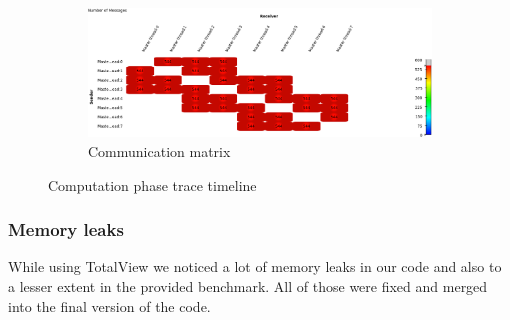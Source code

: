 \documentclass{article}
\begin{document}
\begin{figure}
\begin{subfigure}[b]{\textwidth}
	\end{subfigure}
	\begin{subfigure}[b]{\textwidth}
		\includegraphics[width=\textwidth]{comp-pent-dual-allread-8-Communication_Matrix_View_traces.png}
		\caption{Communication matrix}
		\label{fig:commatrx}
	\end{subfigure}
	\caption{Computation phase trace timeline}\label{fig:8}
\end{figure}

\subsubsection{Memory leaks}
While using TotalView we noticed a lot of memory leaks in our code and also to a lesser extent in the provided benchmark. All of those were fixed and merged into the final version of the code.

\end{document}
